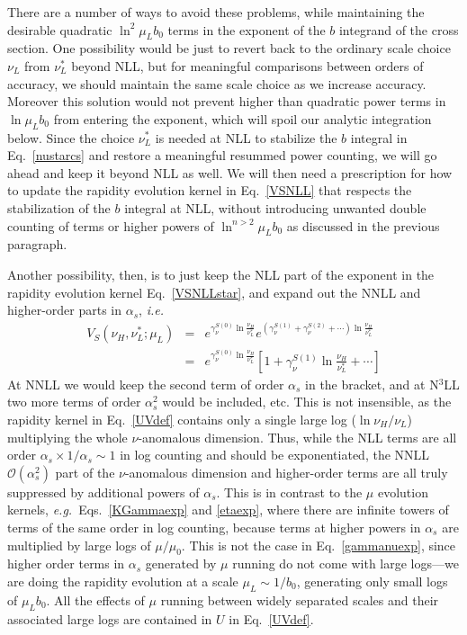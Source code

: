 \documentclass[a4,letterpaper,11pt]{article}
\newcommand{\nn}{\nonumber}
\newcommand{\bea}{\begin{eqnarray}}
\newcommand{\eea}{\end{eqnarray}}
\newcommand{\as}{\alpha_s}
\newcommand{\eg}{\emph{e.g.}~}
\newcommand{\ie}{\emph{i.e.}~}
\newcommand{\cO}{\mathcal{O}}
\newcommand{\eq}[1]{Eq.~\eqref{#1}}
\newcommand{\eqs}[2]{Eqs.~\eqref{#1} and \eqref{#2}}
\begin{document}
There are a number of ways to avoid these problems, while maintaining the desirable quadratic $\ln^2\mu_Lb_0$ terms in the exponent of the $b$ integrand of the cross section. One possibility would be just to revert back to the ordinary scale choice $\nu_L$ from $\nu_L^*$ beyond NLL, but for meaningful comparisons between orders of accuracy, we should maintain the same scale choice as we increase accuracy. Moreover this solution would not prevent higher than quadratic power terms in $\ln\mu_L b_0$ from entering the exponent, which will spoil our analytic integration below. Since the choice $\nu_L^*$ is needed at NLL to stabilize the $b$ integral in \eq{nustarcs} and restore a meaningful resummed power counting, we will go ahead and keep it beyond NLL as well. We will then need a prescription for how to update the rapidity evolution kernel in \eq{VSNLL} that respects the stabilization of the $b$ integral at NLL, without introducing unwanted double counting of terms or higher powers of $\ln^{n>2}\mu_L b_0$ as discussed in the previous paragraph. 

Another possibility, then,  is to just keep the NLL part of the exponent in the rapidity evolution kernel \eq{VSNLLstar}, and expand out the NNLL and higher-order parts in $\as$, \ie 
\bea
V_S(\nu_H,\nu_L^*;\mu_L)&=&e^{\gamma_\nu^{S(0)} \ln \frac{\nu_H}{\nu_L^*}}e^{(\gamma_\nu^{S(1)}+\gamma_\nu^{S(2)}+\cdots) \ln \frac{\nu_H}{\nu_L^*}}
\nn \\
&=&e^{\gamma_\nu^{S(0)} \ln \frac{\nu_H}{\nu_L^*}} \left[1+ \gamma_\nu^{S(1)} \ln \frac{\nu_H}{\nu_L^*}  +\cdots \right]
\label{VStruncated}
\eea
At NNLL we would keep the second term of order $\as$ in the bracket, and at N$^3$LL two more terms of order $\as^2$ would be included, etc. This is not insensible, as the rapidity kernel in \eq{UVdef} contains only a single large log ($\ln \nu_H/\nu_L$) multiplying the whole $\nu$-anomalous dimension. Thus, while the NLL terms are all order $\as \times 1/\as\sim 1$ in log counting and should be exponentiated, the NNLL $\cO(\as^2)$ part of the $\nu$-anomalous dimension and higher-order terms are all truly suppressed by additional powers of $\as$. This is in contrast to the $\mu$ evolution kernels, \eg \eqs{KGammaexp}{etaexp}, where there are infinite towers of terms of the same order in log counting, because terms at higher powers in $\as$ are multiplied by large logs of $\mu/\mu_0$. This is not the case in \eq{gammanuexp}, since higher order terms in $\as$ generated by $\mu$ running do not come with large logs---we are doing the rapidity evolution at a scale $\mu_L\sim 1/b_0$, generating only small logs of $\mu_L b_0$. All the effects of $\mu$ running between widely separated scales and their associated large logs are contained in $U$ in \eq{UVdef}. 
\end{document}
